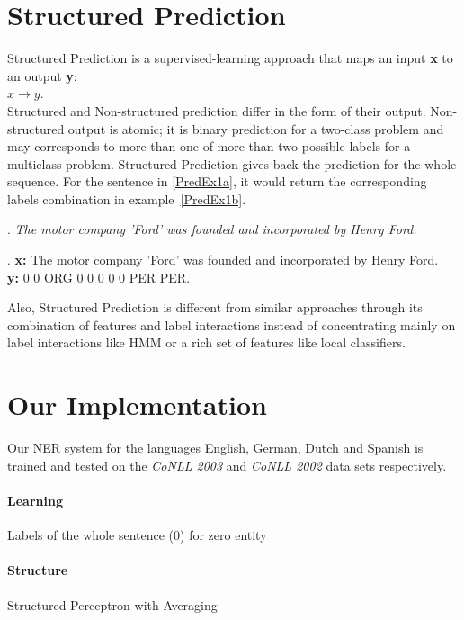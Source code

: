 \documentclass[11pt]{article}
\begin{document}
\section{Structured Prediction}
Structured Prediction \cite{strlearn} is a supervised-learning approach that maps an input \textbf{x} to an output \textbf{y}: \\

$ x \rightarrow y $. \\

Structured and  Non-structured prediction differ in the form of their output. 
Non-structured output is atomic; it is binary prediction for a two-class problem and may corresponds to more than one of more than two possible labels for a 
multiclass problem. 
Structured Prediction gives back the prediction for the whole sequence. 
For the sentence in \ref{PredEx1a}, it would return the corresponding labels combination in example~\ref{PredEx1b}. 

\ex. \emph{The motor company 'Ford' was founded and incorporated  by Henry Ford.} \label{PredEx1a}
 
\ex. \textbf{x:} The motor company 'Ford' was founded and incorporated by Henry Ford.\\ \textbf{y:} 0  0  ORG  0  0 0 0 0 PER PER.  \label{PredEx1b} 
     
Also, Structured Prediction is different from similar approaches through its combination of features and label interactions instead
of concentrating mainly on label interactions like HMM or a rich set of features like local classifiers. 

\section{Our Implementation}
Our NER system for the languages English, German, Dutch and Spanish is trained and tested on the \emph{CoNLL 2003} and \emph{CoNLL 2002} data sets
respectively. 

\paragraph*{Learning}
Labels of the whole sentence (0) for zero entity


\paragraph*{Structure}
Structured Perceptron with Averaging
\end{document}
